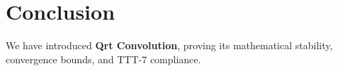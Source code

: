 \section{Conclusion}
We have introduced \textbf{Qrt Convolution}, proving its mathematical stability, convergence bounds, and TTT-7 compliance.